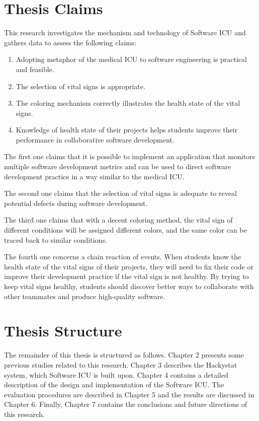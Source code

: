 \section{Thesis Claims}
This research investigates the mechanism and technology of Software ICU and gathers data to assess the following claims: 
\begin{enumerate}
\item Adopting metaphor of the medical ICU to software engineering is practical and feasible.
\item The selection of vital signs is appropriate.
\item The coloring mechanism correctly illustrates the health state of the vital signs.
\item Knowledge of health state of their projects helps students improve their performance in collaborative software development.
\end{enumerate}
The first one claims that it is possible to implement an application that monitors multiple software development metrics and can be used to direct software development practice in a way similar to the medical ICU.

The second one claims that the selection of vital signs is adequate to reveal potential defects during software development.

The third one claims that with a decent coloring method, the vital sign of different conditions will be assigned different colors, and the same color can be traced back to similar conditions.

The fourth one concerns a chain reaction of events. When students know the health state of the vital signs of their projects, they will need to fix their code or improve their development practice if the vital sign is not healthy. By trying to keep vital signs healthy, students should discover better ways to collaborate with other teammates and produce high-quality software.

\section{Thesis Structure}
The remainder of this thesis is structured as follows. Chapter 2 presents some previous studies related to this research. Chapter 3 describes the Hackystat system, which Software ICU is built upon. Chapter 4 contains a detailed description of the design and implementation of the Software ICU. The evaluation procedures are described in Chapter 5 and the results are discussed in Chapter 6. Finally, Chapter 7 contains the conclusions and future directions of this research. 



